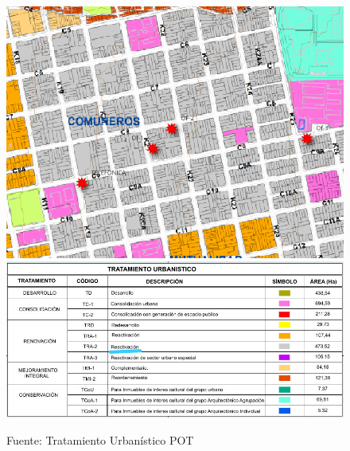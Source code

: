 \documentclass[12pt,a4paper,twoside]{article}
\begin{document}

\begin{figure}[!h]
	\centering
	\includegraphics[width=\textwidth]{Norma/Tratamiento}
	\includegraphics[width=\textwidth]{Norma/TratamientoL}
	\caption{Fuente: Tratamiento Urbanístico POT}
	\label{fig:tratamiento}
\end{figure}
\end{document}

